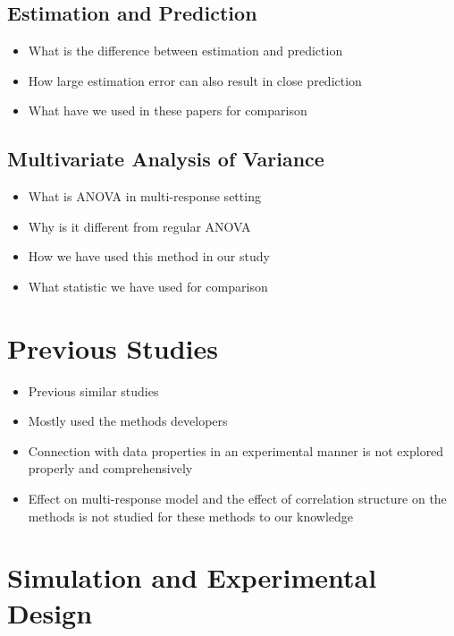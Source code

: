 \documentclass[11pt,twoside,openright,titlepage,
  headinclude,footinclude,BCOR=5mm,
  numbers=noenddot,cleardoublepage=empty,
  tablecaptionabove, dottedtoc,
  bibliography=totoc]{scrreprt}
\providecommand{\tightlist}{%
  \setlength{\itemsep}{0pt}\setlength{\parskip}{0pt}}
\begin{document}
\hypertarget{estimation-and-prediction}{%
\subsection{Estimation and Prediction}\label{estimation-and-prediction}}

\begin{itemize}
\tightlist
\item
  What is the difference between estimation and prediction
\item
  How large estimation error can also result in close prediction
\item
  What have we used in these papers for comparison
\end{itemize}

\hypertarget{multivariate-analysis-of-variance}{%
\subsection{Multivariate Analysis of Variance}\label{multivariate-analysis-of-variance}}

\begin{itemize}
\tightlist
\item
  What is ANOVA in multi-response setting
\item
  Why is it different from regular ANOVA
\item
  How we have used this method in our study
\item
  What statistic we have used for comparison
\end{itemize}

\hypertarget{previous-studies}{%
\section{Previous Studies}\label{previous-studies}}

\begin{itemize}
\tightlist
\item
  Previous similar studies
\item
  Mostly used the methods developers
\item
  Connection with data properties in an experimental manner is not explored properly and comprehensively
\item
  Effect on multi-response model and the effect of correlation structure on the methods is not studied for these methods to our knowledge
\end{itemize}

\hypertarget{simulation-and-experimental-design}{%
\section{Simulation and Experimental Design}\label{simulation-and-experimental-design}}
\end{document}
